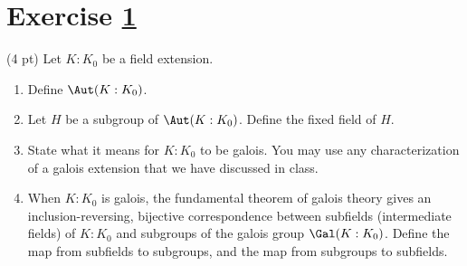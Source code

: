 \section{Exercise \ref{sec : e02q4}}
\label{sec : e02q4}

(4 pt) Let $K : K_{0}$ be a field extension.
\begin{enumerate}[label=(\alph*)]
\item\label{itm : e02q4a} Define $\Aut(K : K_{0})$.
\item\label{itm : e02q4b} Let $H$ be a subgroup of $\Aut(K : K_{0})$. Define the fixed field of $H$.
\item\label{itm : e02q4c} State what it means for $K : K_{0}$ to be galois. You may use any characterization of a galois extension that we have discussed in class.
\item\label{itm : e02q4d} When $K : K_{0}$ is galois, the fundamental theorem of galois theory gives an inclusion-reversing, bijective correspondence between subfields (intermediate fields) of $K : K_{0}$ and subgroups of the galois group $\Gal(K : K_{0})$. Define the map from subfields to subgroups, and the map from subgroups to subfields.
\end{enumerate}

